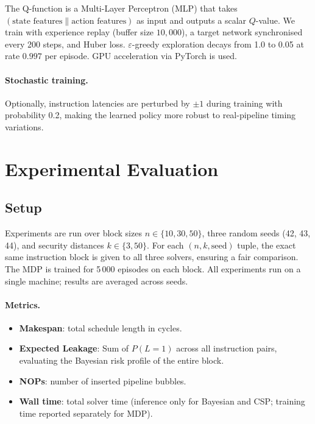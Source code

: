 \documentclass[letterpaper]{article}
\begin{document}
The Q-function is a Multi-Layer Perceptron (MLP) that takes
$(\text{state features} \| \text{action features})$ as input and
outputs a scalar $Q$-value.  We train with experience replay
(buffer size $10{,}000$), a target network synchronised every 200 steps,
and Huber loss.  $\varepsilon$-greedy exploration decays from 1.0 to
0.05 at rate $0.997$ per episode.  GPU acceleration via PyTorch is used.

\paragraph{Stochastic training.}
Optionally, instruction latencies are perturbed by $\pm 1$ during
training with probability 0.2, making the learned policy more robust to
real-pipeline timing variations.

\section{Experimental Evaluation}
\label{sec:experiments}

\subsection{Setup}

Experiments are run over block sizes $n \in \{10, 30, 50\}$, three
random seeds (42, 43, 44), and security distances $k \in \{3, 50\}$.
For each $(n, k, \text{seed})$ tuple, the exact same instruction block is
given to all three solvers, ensuring a fair comparison.  The MDP is
trained for 5\,000 episodes on each block.  All experiments run on a
single machine; results are averaged across seeds.

\paragraph{Metrics.}
\begin{itemize}\setlength\itemsep{0pt}
  \item \textbf{Makespan}: total schedule length in cycles.
  \item \textbf{Expected Leakage}: Sum of $P(L=1)$ across all instruction pairs, evaluating the Bayesian risk profile of the entire block.
  \item \textbf{NOPs}: number of inserted pipeline bubbles.
  \item \textbf{Wall time}: total solver time (inference only for Bayesian and
        CSP; training time reported separately for MDP).
\end{itemize}
\end{document}
